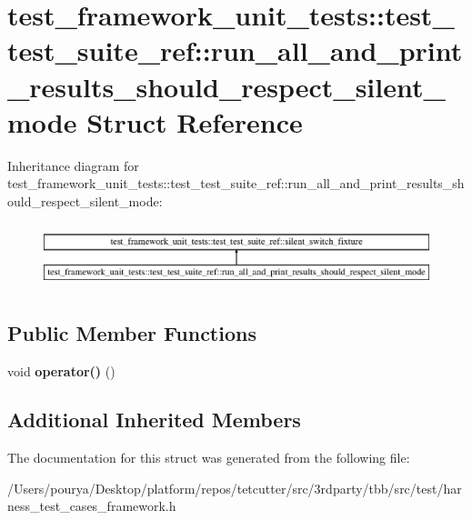 \hypertarget{structtest__framework__unit__tests_1_1test__test__suite__ref_1_1run__all__and__print__results__should__respect__silent__mode}{}\section{test\+\_\+framework\+\_\+unit\+\_\+tests\+:\+:test\+\_\+test\+\_\+suite\+\_\+ref\+:\+:run\+\_\+all\+\_\+and\+\_\+print\+\_\+results\+\_\+should\+\_\+respect\+\_\+silent\+\_\+mode Struct Reference}
\label{structtest__framework__unit__tests_1_1test__test__suite__ref_1_1run__all__and__print__results__should__respect__silent__mode}
Inheritance diagram for test\+\_\+framework\+\_\+unit\+\_\+tests\+:\+:test\+\_\+test\+\_\+suite\+\_\+ref\+:\+:run\+\_\+all\+\_\+and\+\_\+print\+\_\+results\+\_\+should\+\_\+respect\+\_\+silent\+\_\+mode\+:\begin{figure}[H]
\begin{center}
\leavevmode
\includegraphics[height=1.911263cm]{structtest__framework__unit__tests_1_1test__test__suite__ref_1_1run__all__and__print__results__should__respect__silent__mode}
\end{center}
\end{figure}
\subsection*{Public Member Functions}
\begin{DoxyCompactItemize}
\item 
\hypertarget{structtest__framework__unit__tests_1_1test__test__suite__ref_1_1run__all__and__print__results__should__respect__silent__mode_ad87b5f9a623ec15224cf343b811e61a7}{}void {\bfseries operator()} ()\label{structtest__framework__unit__tests_1_1test__test__suite__ref_1_1run__all__and__print__results__should__respect__silent__mode_ad87b5f9a623ec15224cf343b811e61a7}

\end{DoxyCompactItemize}
\subsection*{Additional Inherited Members}


The documentation for this struct was generated from the following file\+:\begin{DoxyCompactItemize}
\item 
/\+Users/pourya/\+Desktop/platform/repos/tetcutter/src/3rdparty/tbb/src/test/harness\+\_\+test\+\_\+cases\+\_\+framework.\+h\end{DoxyCompactItemize}
